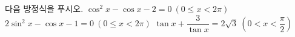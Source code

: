 다음 방정식을 푸시오.
 $\cos^2 x-\cos x-2=0\ (0\le x<2\pi)$
 $2\sin^2 x-\cos x-1=0\ (0\le x<2\pi)$
 $\tan x+\dfrac{3}{\tan x}=2\sqrt{3}\ \left(0<x<\dfrac{\pi}{2}\right)$
